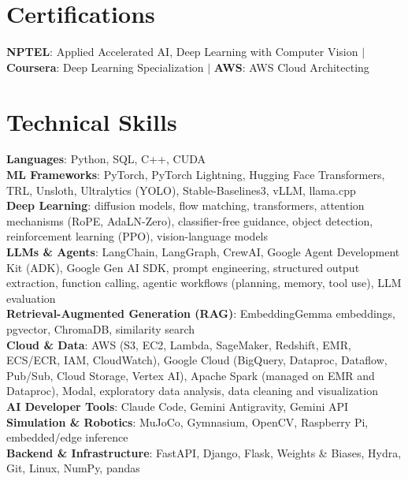 \documentclass[letterpaper,11pt]{article}
\begin{document}
\section{Certifications}
 \begin{itemize}[leftmargin=0.15in, label={}]
    \small{\item{
     \textbf{NPTEL}{: Applied Accelerated AI, Deep Learning with Computer Vision} \hspace{3pt}$|$\hspace{3pt} \textbf{Coursera}{: Deep Learning Specialization} \hspace{3pt}$|$\hspace{3pt} \textbf{AWS}{: AWS Cloud Architecting}
    }}
 \end{itemize}

\section{Technical Skills}
 \begin{itemize}[leftmargin=0.15in, label={}]
    \small{\item{
     \textbf{Languages}{: Python, SQL, C++, CUDA} \\
     \textbf{ML Frameworks}{: PyTorch, PyTorch Lightning, Hugging Face Transformers, TRL, Unsloth, Ultralytics (YOLO), Stable-Baselines3, vLLM, llama.cpp} \\
     \textbf{Deep Learning}{: diffusion models, flow matching, transformers, attention mechanisms (RoPE, AdaLN-Zero), classifier-free guidance, object detection, reinforcement learning (PPO), vision-language models} \\
     \textbf{LLMs \& Agents}{: LangChain, LangGraph, CrewAI, Google Agent Development Kit (ADK), Google Gen AI SDK, prompt engineering, structured output extraction, function calling, agentic workflows (planning, memory, tool use), LLM evaluation} \\
     \textbf{Retrieval-Augmented Generation (RAG)}{: EmbeddingGemma embeddings, pgvector, ChromaDB, similarity search} \\
     \textbf{Cloud \& Data}{: AWS (S3, EC2, Lambda, SageMaker, Redshift, EMR, ECS/ECR, IAM, CloudWatch), Google Cloud (BigQuery, Dataproc, Dataflow, Pub/Sub, Cloud Storage, Vertex AI), Apache Spark (managed on EMR and Dataproc), Modal, exploratory data analysis, data cleaning and visualization} \\
     \textbf{AI Developer Tools}{: Claude Code, Gemini Antigravity, Gemini API} \\
     \textbf{Simulation \& Robotics}{: MuJoCo, Gymnasium, OpenCV, Raspberry Pi, embedded/edge inference} \\
     \textbf{Backend \& Infrastructure}{: FastAPI, Django, Flask, Weights \& Biases, Hydra, Git, Linux, NumPy, pandas}
    }}
 \end{itemize}
\end{document}
